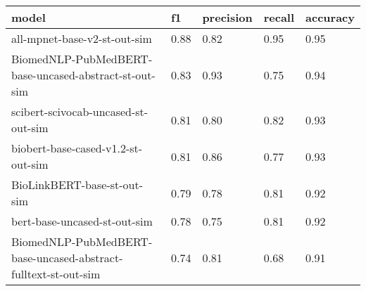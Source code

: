 \begin{tabular}{lllll}
\toprule
model & f1 & precision & recall & accuracy \\
\midrule
all-mpnet-base-v2-st-out-sim & 0.88 & 0.82 & 0.95 & 0.95 \\
BiomedNLP-PubMedBERT-base-uncased-abstract-st-out-sim & 0.83 & 0.93 & 0.75 & 0.94 \\
scibert-scivocab-uncased-st-out-sim & 0.81 & 0.80 & 0.82 & 0.93 \\
biobert-base-cased-v1.2-st-out-sim & 0.81 & 0.86 & 0.77 & 0.93 \\
BioLinkBERT-base-st-out-sim & 0.79 & 0.78 & 0.81 & 0.92 \\
bert-base-uncased-st-out-sim & 0.78 & 0.75 & 0.81 & 0.92 \\
BiomedNLP-PubMedBERT-base-uncased-abstract-fulltext-st-out-sim & 0.74 & 0.81 & 0.68 & 0.91 \\
\bottomrule
\end{tabular}
